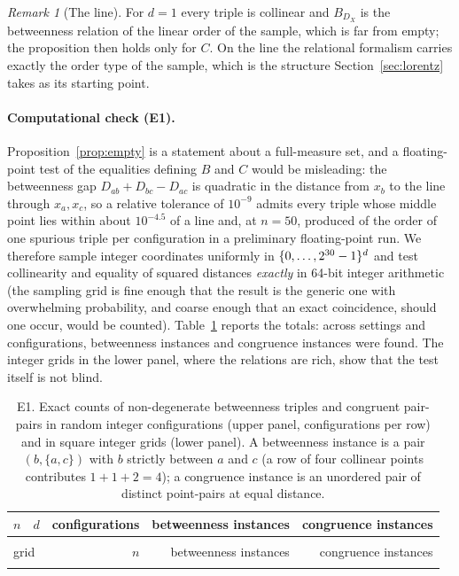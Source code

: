\documentclass[11pt,a4paper]{article}
\theoremstyle{plain}
\theoremstyle{definition}
\theoremstyle{remark}
\newtheorem{remark}[theorem]{Remark}
\begin{document}
\begin{remark}[The line]
For $d=1$ every triple is collinear and $B_{D_X}$ is the betweenness relation of the linear order of the sample, which is far from empty; the proposition then holds only for $C$. On the line the relational formalism carries exactly the order type of the sample, which is the structure Section~\ref{sec:lorentz} takes as its starting point.
\end{remark}

\paragraph{Computational check (E1).}
Proposition~\ref{prop:empty} is a statement about a full-measure set, and a floating-point test of the equalities defining $B$ and $C$ would be misleading: the betweenness gap $D_{ab}+D_{bc}-D_{ac}$ is quadratic in the distance from $x_b$ to the line through $x_a,x_c$, so a relative tolerance of $10^{-9}$ admits every triple whose middle point lies within about $10^{-4.5}$ of a line and, at $n=50$, produced of the order of one spurious triple per configuration in a preliminary floating-point run. We therefore sample integer coordinates uniformly in $\{0,\dots,2^{30}-1\}^d$ and test collinearity and equality of squared distances \emph{exactly} in 64-bit integer arithmetic (the sampling grid is fine enough that the result is the generic one with overwhelming probability, and coarse enough that an exact coincidence, should one occur, would be counted). Table~\ref{tab:e1} reports the totals: across \EoneSettings{} settings and \EoneTotalConfigs{} configurations, \EoneBetweenTotal{} betweenness instances and \EoneCongTotal{} congruence instances were found. The integer grids in the lower panel, where the relations are rich, show that the test itself is not blind.

\begin{table}[t]
\centering\small
\begin{tabular}{rrrrr}
\toprule
$n$ & $d$ & configurations & betweenness instances & congruence instances\\
\midrule
\\
\midrule
\multicolumn{2}{l}{grid} & $n$ & betweenness instances & congruence instances\\
\midrule
\\
\bottomrule
\end{tabular}
\caption{E1. Exact counts of non-degenerate betweenness triples and congruent pair-pairs in random integer configurations (upper panel, \EoneConfigs{} configurations per row) and in square integer grids (lower panel). A betweenness instance is a pair $(b,\{a,c\})$ with $b$ strictly between $a$ and $c$ (a row of four collinear points contributes $1+1+2=4$); a congruence instance is an unordered pair of distinct point-pairs at equal distance.}
\label{tab:e1}
\end{table}
\end{document}
